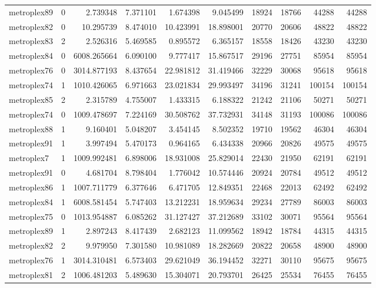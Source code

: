 \begin{longtable}{|l|r|r|r|r|r|r|r|r|r|}
metroplex89 & 0 & 2.739348 & 7.371101 & 1.674398 & 9.045499 & 18924 & 18766 & 44288 & 44288 \\
metroplex82 & 0 & 10.295739 & 8.474010 & 10.423991 & 18.898001 & 20770 & 20606 & 48822 & 48822 \\
metroplex83 & 2 & 2.526316 & 5.469585 & 0.895572 & 6.365157 & 18558 & 18426 & 43230 & 43230 \\
metroplex84 & 0 & 6008.265664 & 6.090100 & 9.777417 & 15.867517 & 29196 & 27751 & 85954 & 85954 \\
metroplex76 & 0 & 3014.877193 & 8.437654 & 22.981812 & 31.419466 & 32229 & 30068 & 95618 & 95618 \\
metroplex74 & 1 & 1010.426065 & 6.971663 & 23.021834 & 29.993497 & 34196 & 31241 & 100154 & 100154 \\
metroplex85 & 2 & 2.315789 & 4.755007 & 1.433315 & 6.188322 & 21242 & 21106 & 50271 & 50271 \\
metroplex74 & 0 & 1009.478697 & 7.224169 & 30.508762 & 37.732931 & 34148 & 31193 & 100086 & 100086 \\
metroplex88 & 1 & 9.160401 & 5.048207 & 3.454145 & 8.502352 & 19710 & 19562 & 46304 & 46304 \\
metroplex91 & 1 & 3.997494 & 5.470173 & 0.964165 & 6.434338 & 20966 & 20826 & 49575 & 49575 \\
metroplex7 & 1 & 1009.992481 & 6.898006 & 18.931008 & 25.829014 & 22430 & 21950 & 62191 & 62191 \\
metroplex91 & 0 & 4.681704 & 8.798404 & 1.776042 & 10.574446 & 20924 & 20784 & 49512 & 49512 \\
metroplex86 & 1 & 1007.711779 & 6.377646 & 6.471705 & 12.849351 & 22468 & 22013 & 62492 & 62492 \\
metroplex84 & 1 & 6008.581454 & 5.747403 & 13.212231 & 18.959634 & 29234 & 27789 & 86003 & 86003 \\
metroplex75 & 0 & 1013.954887 & 6.085262 & 31.127427 & 37.212689 & 33102 & 30071 & 95564 & 95564 \\
metroplex89 & 1 & 2.897243 & 8.417439 & 2.682123 & 11.099562 & 18942 & 18784 & 44315 & 44315 \\
metroplex82 & 2 & 9.979950 & 7.301580 & 10.981089 & 18.282669 & 20822 & 20658 & 48900 & 48900 \\
metroplex76 & 1 & 3014.310481 & 6.573403 & 29.621049 & 36.194452 & 32271 & 30110 & 95675 & 95675 \\
metroplex81 & 2 & 1006.481203 & 5.489630 & 15.304071 & 20.793701 & 26425 & 25534 & 76455 & 76455 \\

\end{longtable}
